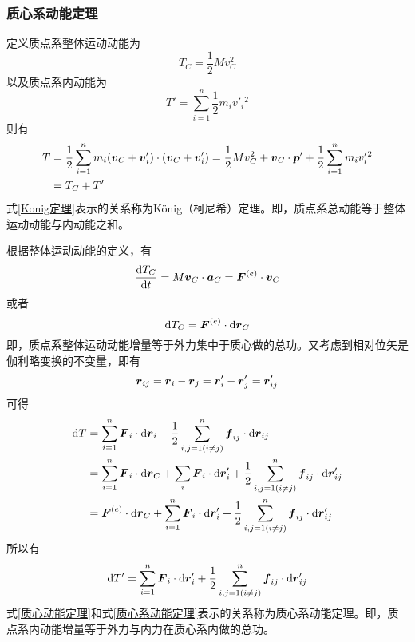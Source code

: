 \subsubsection{质心系动能定理}

定义{\heiti 质点系整体运动动能}为
\begin{equation}
	T_C = \frac12 M v_C^2
\end{equation}
以及{\heiti 质点系内动能}为
\begin{equation}
	T' = \sum_{i=1}^n \frac12 m_i v'_i{}^2
\end{equation}
则有
\begin{align}
	T & = \frac12 \sum_{i=1}^n m_i(\boldsymbol{v}_C + \boldsymbol{v}'_i) \cdot (\boldsymbol{v}_C + \boldsymbol{v}'_i) = \frac12 M v_C^2 + \boldsymbol{v}_C \cdot \boldsymbol{p}' + \frac12\sum_{i=1}^n m_i v'_i{}^2 \nonumber \\
	& = T_C + T' \label{Konig定理}
\end{align}
式\eqref{Konig定理}表示的关系称为{\heiti K\"onig（柯尼希）定理}。即，质点系总动能等于整体运动动能与内动能之和。

根据整体运动动能的定义，有
\begin{equation}
	\frac{\mathrm{d} T_C}{\mathrm{d} t} = M\boldsymbol{v}_C \cdot \boldsymbol{a}_C = \boldsymbol{F}^{(e)} \cdot \boldsymbol{v}_C
\end{equation}
或者
\begin{equation}
	\mathrm{d}T_C = \boldsymbol{F}^{(e)} \cdot \mathrm{d} \boldsymbol{r}_C
	\label{质心动能定理}
\end{equation}
即，质点系整体运动动能增量等于外力集中于质心做的总功。又考虑到相对位矢是伽利略变换的不变量，即有
\begin{equation*}
	\boldsymbol{r}_{ij} = \boldsymbol{r}_i - \boldsymbol{r}_j = \boldsymbol{r}'_i - \boldsymbol{r}'_j = \boldsymbol{r}'_{ij}
\end{equation*}
可得
\begin{align*}
	\mathrm{d} T & = \sum_{i=1}^n \boldsymbol{F}_i \cdot \mathrm{d} \boldsymbol{r}_i + \frac12 \sum_{i,j=1(i\neq j)}^n \boldsymbol{f}_{ij} \cdot \mathrm{d} \boldsymbol{r}_{ij} \\
	& = \sum_{i=1}^n \boldsymbol{F}_i \cdot \mathrm{d} \boldsymbol{r}_C + \sum_i \boldsymbol{F}_i \cdot \mathrm{d} \boldsymbol{r}'_i + \frac12 \sum_{i,j=1(i\neq j)}^n \boldsymbol{f}_{ij} \cdot \mathrm{d} \boldsymbol{r}'_{ij} \\
	& = \boldsymbol{F}^{(e)} \cdot \mathrm{d} \boldsymbol{r}_C + \sum_{i=1}^n \boldsymbol{F}_i \cdot \mathrm{d} \boldsymbol{r}'_i + \frac12 \sum_{i,j=1(i \neq j)}^n \boldsymbol{f}_{ij} \cdot \mathrm{d} \boldsymbol{r}'_{ij}
\end{align*}
所以有
\begin{equation}
	\mathrm{d} T' = \sum_{i=1}^n \boldsymbol{F}_i \cdot \mathrm{d} \boldsymbol{r}'_i + \frac12 \sum_{i,j=1(i \neq j)}^n \boldsymbol{f}_{ij} \cdot \mathrm{d} \boldsymbol{r}'_{ij}
	\label{质心系动能定理}
\end{equation}
式\eqref{质心动能定理}和式\eqref{质心系动能定理}表示的关系称为{\heiti 质心系动能定理}。即，质点系内动能增量等于外力与内力在质心系内做的总功。

